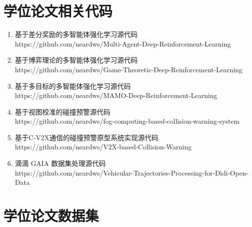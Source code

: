 \section[\hspace{-2pt}学位论文相关代码]{{ \hspace{-8pt}学位论文相关代码}}
\begin{enumerate}
	\item 基于差分奖励的多智能体强化学习源代码\\https://github.com/neardws/Multi-Agent-Deep-Reinforcement-Learning
	\item 基于博弈理论的多智能体强化学习源代码\\https://github.com/neardws/Game-Theoretic-Deep-Reinforcement-Learning
	\item 基于多目标的多智能体强化学习源代码\\https://github.com/neardws/MAMO-Deep-Reinforcement-Learning
	\item 基于视图校准的碰撞预警源代码\\https://github.com/neardws/fog-computing-based-collision-warning-system
	\item 基于C-V2X通信的碰撞预警原型系统实现源代码\\https://github.com/neardws/V2X-based-Collision-Warning
	\item 滴滴 GAIA 数据集处理源代码\\https://github.com/neardws/Vehicular-Trajectories-Processing-for-Didi-Open-Data
\end{enumerate}

\newpage
\section[\hspace{-2pt}学位论文数据集]{{ \hspace{-8pt}学位论文数据集}}


